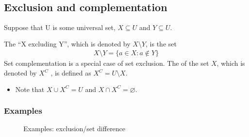 \documentclass[letterpaper,10pt,english]{jupyterBook}
\begin{document}
\subsection{Exclusion and complementation}
\label{\detokenize{02.sets_numbers_coordinates_distances:exclusion-and-complementation}}
\sphinxAtStartPar
Suppose that U is some universal set, \(X \subseteq U\) and \(Y \subseteq U\).

\sphinxAtStartPar
The  “X excluding Y”, which is denoted by \(X \setminus Y\), is the set
\begin{equation*}
\begin{split}X \setminus Y = \{a \in X : a \notin Y \}\end{split}
\end{equation*}
\sphinxAtStartPar
Set complementation is a special case of set exclusion. The  of the set \(X\), which is denoted by \(X^C\) , is defined as \(X^C = U \setminus X\).
\begin{itemize}
\item {} 
\sphinxAtStartPar
Note that \(X \cup X^C = U\) and \(X \cap X^C = \varnothing\).

\end{itemize}

\sphinxAtStartPar
{}


\subsubsection{Examples}
\label{\detokenize{02.sets_numbers_coordinates_distances:id2}}
\begin{figure}[htbp]
\centering
\capstart

\noindent{}
\caption{Examples: exclusion/set difference}\label{\detokenize{02.sets_numbers_coordinates_distances:id6}}\end{figure}
\end{document}
